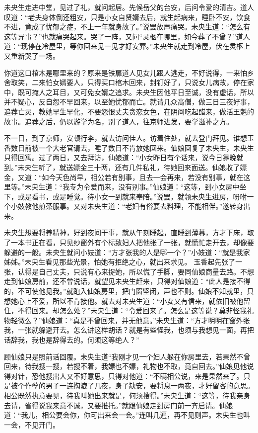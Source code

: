 \documentclass[a4paper,12pt,UTF8,twoside]{ctexbook}
\begin{document}
未央生走进中堂，见过了礼，就问起居。先候岳父的台安，后问令爱的清吉。道人叹道：“老夫身体倒还粗安，只是小女自贤婿去后，就生起病来，睡卧不安，饮食不进，竟成了忧郁之症，不上一年就身故了。”说罢放声痛哭。未央生道：“怎么有这等异事？”也就痛哭起来。哭了一阵，又问“灵柩在哪里，如今葬了不曾？”道人道：“现停在冷屋里，等你回来见一见才好安葬。”未央生就走到冷屋，伏在灵柩上又重新哭了一场。

你道这口棺木是哪里来的？原来是铁扉道人见女儿跟人逃走，不好说得，一来怕乡舍取笑，二来怕女婿要人，只得买口棺木回来，封钉好了，只说女儿病故，停在家中，既可掩人之耳目，又可免女婿之追求。未央生因他平日至诚，没有虚话，所以并不疑心，反自怨不早回来，以至她忧郁而亡。就请几众高僧，做三日三夜好事，追荐亡灵，教她早生早化，不要怨恨丈夫贪恋女色，在阴间吃起醋来，做活王魁的故事。追荐之后，仍以游学为名，别了道人，往京师进发，要学滋补之方。

不一日，到了京师，安顿行李，就去访问佳人。访着住处，就去登门拜见。谁想玉香数日前被一个大老官请去，睡了数日不肯放她回来。仙娘回复了未央生，未央生只得回寓。过了两日，又去拜访，仙娘道：“小女昨日有个话来，说今日靠晚就到。”未央生听了，就送嫖金三十两，还有几件私礼，待她回来面送。仙娘收了嫖金，又道：“如今天色尚早，相公若有别事，且去一会再来，若没有别事，就在这里等。”未央生道：“我专为令爱而来，没有别事。”仙娘道：“这等，到小女房中坐下，或是看书，或是睡觉。待小女一到就来奉陪。”说罢，就领未央生进房，吩咐一个小妓教他煎茶服事。又对未央生道：“老妇有俗要去料理，不能相伴。”遂转身出来。

未央生想要将养精神，好到夜间干事，就从午刻睡起，直睡到薄暮，方才下床，取了一本书正在看，只见纱窗外有个标致妇人把他张了一张，就慌忙走开去，却像要躲避的一般。未央生就问小妓道：“方才张我的人是哪一个？”小妓道：“就是我家姊姊。”未央生看见那些光景，怕她有拒绝之心，就出来求见。 玉香起先张了一张，认得是自己丈夫，只说有心来捉她，所以慌了手脚，要同仙娘商量去路。不想走到仙娘房前，还不曾说话，就望见未央生赶来，只得对仙娘道：“此人是接不得的，不可使他见我。”就跑入仙娘房里，把门窗坚闭，声也不则。仙娘不知就里，只想她心上不爱，所以不肯接他。就去对未央生道：“小女又有信来，就依旧被他留住，不得回来。却怎么处？”未央生道：“令爱回来了。怎么是这等说？莫非怪我礼物轻微么？”仙娘道：“真是不曾回来，并无他意。”未央生道：“方才明明在窗外张我，一张就躲避开去。怎么讲这样胡话？就是有些怪我，也须与我想见一面，再把话辞我，我也是辞得去的。何须这等绝人？”

顾仙娘只是照前话回覆。未央生道“我刚才见一个妇人躲在你房里去，若果然不曾回来，待我搜一搜，若搜不着，我嫖也不嫖，礼物也不取，竟自回去。”仙娘见他说得对针，恐他搜出人又不好意思，只得对他道：“不瞒相公说，来是果然来了。只是被个作孽的男子一连掏漉了几夜，身子缺安，要将息一两夜，才好留客的意思。相公既然执意要见，待我叫她出来就是，何须搜得。”未央生道：“这等，待我亲身去请，省得说我来意不诚，又要推托。”就跟仙娘走到房门前一齐启请。仙娘道：“我儿，相公要会你，你可出来会一会。”连叫几遍，再不见则声。未央生也叫一会，不见开门。
\end{document}

